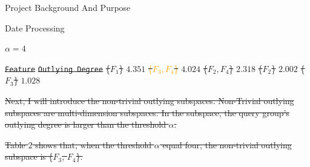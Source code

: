 \documentclass[
 size=14pt,
 paper=smartboard,  %
 mode=present, 		%
 display=slides, 	%
 style=tuliplab,  	%
 pauseslide,
 fleqn,leqno]{powerdot}
\providecommand{\DIFdeltex}[1]{{\protect\color{red}\sout{#1}}}                      %
\providecommand{\DIFdelFL}[1]{\DIFdel{#1}} %
\providecommand{\DIFdel}[1]{\texorpdfstring{\DIFdeltex{#1}}{}} %
\begin{document}
\begin{slide}
\begin{slide}{Project Background And Purpose}
\begin{slide}{Date Processing}
\begin{note}
{%
\DIFdelFL{$\alpha = 4$}}

\texttt{\DIFdelFL{Feature}}  %
\texttt{\DIFdelFL{Outlying Degree}}  %
\DIFdelFL{\{$F_1$\}}%
\DIFdelFL{$4.351$ }%
\DIFdelFL{\textcolor{orange}{\{$F_3, F_4$\}}}%
\DIFdelFL{$4.024$ }%
\DIFdelFL{\{$F_2, F_4$\}}%
\DIFdelFL{$2.318$ }%
\DIFdelFL{\{$F_2$\}}%
\DIFdelFL{$2.002$ }%
\DIFdelFL{\{$F_3$\}}%
\DIFdelFL{$1.028$ }%

\DIFdel{Next,
I will introduce the non-trivial outlying subspaces.
Non-Trivial outlying subspaces are multi-dimension subspaces.
In the subspace,
the query group's outlying degree is larger than the threshold $\alpha$.
}%

\DIFdel{Table $2$ shows that,
when the threshold $\alpha$ equal four,
the non-trivial outlying subspace is \{$F_3$, $F_4$\}.
}%



\end{note}
\end{slide}
\end{slide}
\end{slide}
\end{document}
